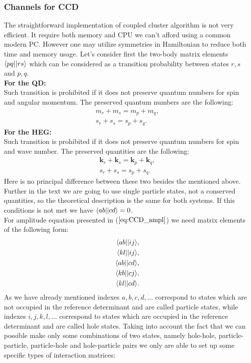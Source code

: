 \documentclass[twoside,english]{uiofysmaster}
\theoremstyle{definition}
\begin{document}
\subsubsection{Channels for CCD}
The straightforward implementation of coupled cluster algorithm is not very efficient. It require both memory and CPU we can't afford using a common modern PC. However one may utilize symmetries in Hamiltonian to reduce both time and memory usage. Let's consider first the two-body matrix elements $\braket{pq||rs}$ which can be considered as a transition probability between states $r,s$ and $p,q$.\\
\textbf{For the QD:}\\
Such transition is prohibited if it does not preserve quantum numbers for spin and angular momentum. The preserved quantum numbers are the following:
\begin{align}
m_r + m_s = m_p + m_q,\\
s_r + s_s = s_p + s_q.
\end{align}
\textbf{For the HEG:}\\
Such transition is prohibited if it does not preserve quantum numbers for spin and wave number. The preserved quantities are the following:
\begin{align}
\textbf{k}_r + \textbf{k}_s = \textbf{k}_p + \textbf{k}_q,\\
s_r + s_s = s_p + s_q.
\end{align}
Here is no principal difference between these two besides the mentioned above. Further in the text we are going to use single particle states, not a conserved quantities, so the theoretical description is the same for both systems.
If this conditions is not met we have $\braket{ab||cd} = 0$.\\
For amplitude equation presented in ($\ref{eq:CCD_ampl}$) we need matrix elements of the following form:
\begin{align}\label{eq:TBME_channels}
\braket{ab||ij}&,\\
\braket{kl||ij}&,\\
\braket{ab||cd}&,\\
\braket{kb||cj}&,\\
\braket{kl||cd}&.\\
\end{align}
As we have already mentioned indexes $a,b,c,d,...$ correspond to states which are not occupied in the reference determinant and are called particle states, while  indexes $i,j,k,l,...$ correspond to states which are occupied in the reference determinant and are called hole states. Taking into account the fact that we can possible make only some combinations of two states, namely hole-hole, particle-particle, particle-hole and hole-particle pairs we only are able to set up some  specific types of interaction matrices:
\end{document}
